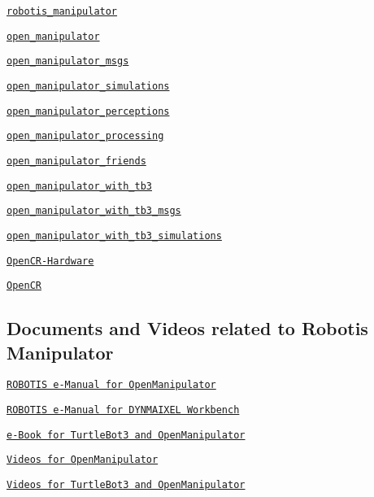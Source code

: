 \begin{DoxyItemize}
\item \href{https://github.com/ROBOTIS-GIT/robotis_manipulator}{\tt robotis\+\_\+manipulator}
\item \href{https://github.com/ROBOTIS-GIT/open_manipulator}{\tt open\+\_\+manipulator}
\item \href{https://github.com/ROBOTIS-GIT/open_manipulator_msgs}{\tt open\+\_\+manipulator\+\_\+msgs}
\item \href{https://github.com/ROBOTIS-GIT/open_manipulator_simulations}{\tt open\+\_\+manipulator\+\_\+simulations}
\item \href{https://github.com/ROBOTIS-GIT/open_manipulator_perceptions}{\tt open\+\_\+manipulator\+\_\+perceptions}
\item \href{https://github.com/ROBOTIS-GIT/open_manipulator_processing}{\tt open\+\_\+manipulator\+\_\+processing}
\item \href{https://github.com/ROBOTIS-GIT/open_manipulator_friends}{\tt open\+\_\+manipulator\+\_\+friends}
\item \href{https://github.com/ROBOTIS-GIT/open_manipulator_with_tb3}{\tt open\+\_\+manipulator\+\_\+with\+\_\+tb3}
\item \href{https://github.com/ROBOTIS-GIT/open_manipulator_with_tb3_msgs}{\tt open\+\_\+manipulator\+\_\+with\+\_\+tb3\+\_\+msgs}
\item \href{https://github.com/ROBOTIS-GIT/open_manipulator_with_tb3_simulations}{\tt open\+\_\+manipulator\+\_\+with\+\_\+tb3\+\_\+simulations}
\item \href{https://github.com/ROBOTIS-GIT/OpenCR-Hardware}{\tt Open\+C\+R-\/\+Hardware}
\item \href{https://github.com/ROBOTIS-GIT/OpenCR}{\tt Open\+CR}
\end{DoxyItemize}

\subsection*{Documents and Videos related to Robotis Manipulator}


\begin{DoxyItemize}
\item \href{http://emanual.robotis.com/docs/en/platform/openmanipulator/}{\tt R\+O\+B\+O\+T\+IS e-\/\+Manual for Open\+Manipulator}
\item \href{http://emanual.robotis.com/docs/en/software/dynamixel/dynamixel_workbench/}{\tt R\+O\+B\+O\+T\+IS e-\/\+Manual for DYNMAIXEL Workbench}
\item \href{https://community.robotsource.org/t/download-the-ros-robot-programming-book-for-free/51/}{\tt e-\/\+Book for Turtle\+Bot3 and Open\+Manipulator}
\item \href{https://www.youtube.com/playlist?list=PLRG6WP3c31_WpEsB6_Rdt3KhiopXQlUkb}{\tt Videos for Open\+Manipulator}
\item \href{https://www.youtube.com/playlist?list=PLRG6WP3c31_XI3wlvHlx2Mp8BYqgqDURU}{\tt Videos for Turtle\+Bot3 and Open\+Manipulator} 
\end{DoxyItemize}
